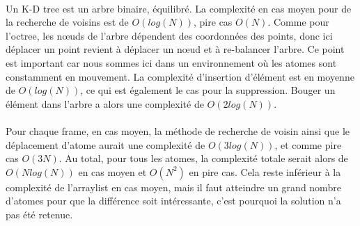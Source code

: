 \paragraph{}
Un K-D tree est un arbre binaire, équilibré. La complexité en cas moyen pour de
la recherche de voisins est de $O(log(N))$, pire cas $O(N)$. Comme pour
l'octree, les nœuds de l'arbre dépendent des coordonnées des points, donc ici
déplacer un point revient à déplacer un nœud et à re-balancer l'arbre. Ce point
est important car nous sommes ici dans un environnement où les atomes sont
constamment en mouvement.  La complexité d'insertion d'élément est en moyenne
de $O(log(N))$, ce qui est également le cas pour la suppression. Bouger un
élément dans l'arbre a alors une complexité de $O(2log(N))$.

\paragraph{}
Pour chaque frame, en cas moyen, la méthode de recherche de voisin ainsi que le
déplacement d'atome aurait une complexité de $O(3log(N))$, et comme pire cas
$O(3N)$. Au total, pour tous les atomes, la complexité totale serait alors de
$O(Nlog(N))$ en cas moyen et $O(N^2)$ en pire cas. Cela reste inférieur à la
complexité de l'arraylist en cas moyen, mais il faut atteindre un grand nombre
d'atomes pour que la différence soit intéressante, c'est pourquoi la solution
n'a pas été retenue.
